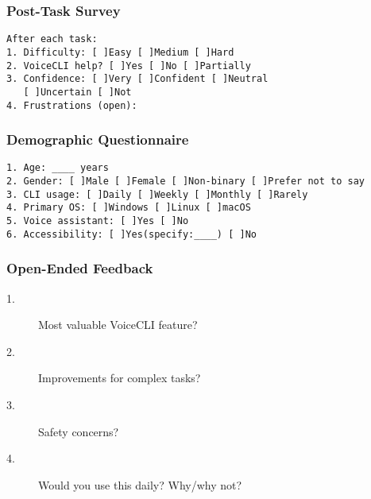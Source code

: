 \documentclass[a4paper,12pt]{article}
\begin{document}
\subsubsection{Post-Task Survey}
\begin{verbatim}
After each task: 
1. Difficulty: [ ]Easy [ ]Medium [ ]Hard
2. VoiceCLI help? [ ]Yes [ ]No [ ]Partially
3. Confidence: [ ]Very [ ]Confident [ ]Neutral 
   [ ]Uncertain [ ]Not
4. Frustrations (open):
\end{verbatim}

\subsubsection{Demographic Questionnaire}
\begin{verbatim}
1. Age: ____ years  
2. Gender: [ ]Male [ ]Female [ ]Non-binary [ ]Prefer not to say
3. CLI usage: [ ]Daily [ ]Weekly [ ]Monthly [ ]Rarely
4. Primary OS: [ ]Windows [ ]Linux [ ]macOS
5. Voice assistant: [ ]Yes [ ]No  
6. Accessibility: [ ]Yes(specify:____) [ ]No
\end{verbatim}

\subsubsection{Open-Ended Feedback}

\begin{description}
\item[1.] {Most valuable VoiceCLI feature?}
\item[2.] {Improvements for complex tasks?}
\item[3.] {Safety concerns?}
\item[4.] {Would you use this daily? Why/why not?}
\end{description}
\end{document}
